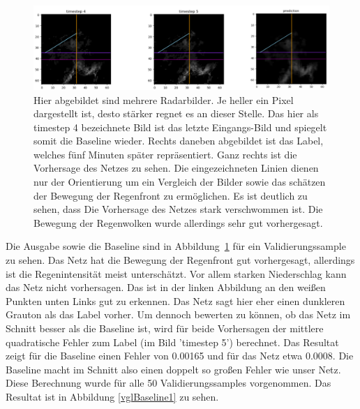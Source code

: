 \begin{figure}[h]
	\centering
	\includegraphics[width=\linewidth]{pics/mse_vgl1}
	\caption[Radarbilder für fünf-minuten Vorhersage]{Hier abgebildet sind mehrere Radarbilder. Je heller ein Pixel dargestellt ist, desto stärker regnet es an dieser Stelle. Das hier als timestep 4 bezeichnete Bild ist das letzte Eingangs-Bild und spiegelt somit die Baseline wieder. Rechts daneben abgebildet ist das Label, welches fünf Minuten später repräsentiert. Ganz rechts ist die Vorhersage des Netzes zu sehen. Die eingezeichneten Linien dienen nur der Orientierung um ein Vergleich der Bilder sowie das schätzen der Bewegung der Regenfront zu ermöglichen. Es ist deutlich zu sehen, dass Die Vorhersage des Netzes stark verschwommen ist. Die Bewegung der Regenwolken wurde allerdings sehr gut vorhergesagt. }
	\label{mse_VGL1}
\end{figure}

Die Ausgabe sowie die Baseline sind in Abbildung~\ref{mse_VGL1} für ein Validierungssample zu sehen. Das Netz hat die Bewegung der Regenfront gut vorhergesagt, allerdings ist die Regenintensität meist unterschätzt. Vor allem starken Niederschlag kann das Netz nicht vorhersagen. Das ist in der linken Abbildung an den weißen Punkten unten Links gut zu erkennen. Das Netz sagt hier eher einen dunkleren Grauton als das Label vorher. Um dennoch bewerten zu können, ob das Netz im Schnitt besser als die Baseline ist, wird für beide Vorhersagen der mittlere quadratische Fehler zum Label (im Bild 'timestep 5') berechnet. Das Resultat zeigt für die Baseline einen Fehler von 0.00165 und für das Netz etwa 0.0008. Die Baseline macht im Schnitt also einen doppelt so großen Fehler wie unser Netz. Diese Berechnung wurde für alle 50 Validierungssamples vorgenommen. Das Resultat ist in Abbildung \ref{vglBaseline1} zu sehen.

